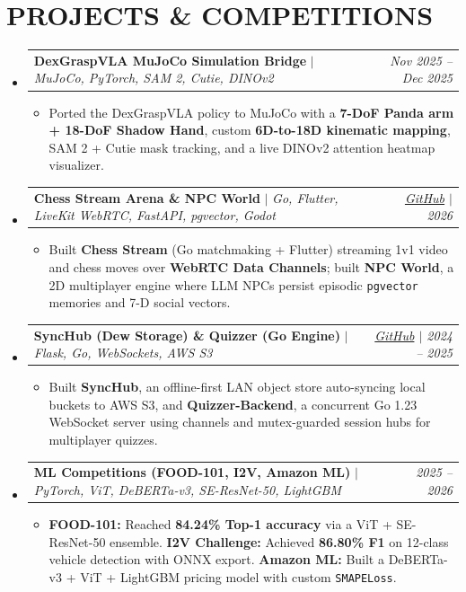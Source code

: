 \documentclass[10pt,a4paper]{article}
\makeatletter
\newcommand{\resumeItem}[1]{
  \item\small{{#1}}
}
\newcommand{\resumeProjectHeading}[2]{
    \vspace{-1pt}\item
    \begin{tabular*}{0.99\textwidth}{@{}l@{\extracolsep{\fill}}r@{}}
      \small #1 & \textit{\small #2} \\
    \end{tabular*}\vspace{-5pt}
}
\newcommand{\resumeItemListStart}{\begin{itemize}[leftmargin=0.18in, topsep=2pt, itemsep=1.5pt, parsep=0pt]}
\newcommand{\resumeItemListEnd}{\end{itemize}\vspace{-4pt}}
\makeatother
\begin{document}
\section{PROJECTS \& COMPETITIONS}
  \begin{itemize}[leftmargin=0.05in, label={}]

    \resumeProjectHeading
      {\textbf{DexGraspVLA MuJoCo Simulation Bridge} $|$ \emph{MuJoCo, PyTorch, SAM 2, Cutie, DINOv2}}{Nov 2025 -- Dec 2025}
      \resumeItemListStart
        \resumeItem{Ported the DexGraspVLA policy to MuJoCo with a \textbf{7-DoF Panda arm + 18-DoF Shadow Hand}, custom \textbf{6D-to-18D kinematic mapping}, SAM 2 + Cutie mask tracking, and a live DINOv2 attention heatmap visualizer.}
      \resumeItemListEnd

    \resumeProjectHeading
      {\textbf{Chess Stream Arena \& NPC World} $|$ \emph{Go, Flutter, LiveKit WebRTC, FastAPI, pgvector, Godot}}{\href{https://github.com/Anurag9689/chess_stream}{GitHub} $|$ 2026}
      \resumeItemListStart
        \resumeItem{Built \textbf{Chess Stream} (Go matchmaking + Flutter) streaming 1v1 video and chess moves over \textbf{WebRTC Data Channels}; built \textbf{NPC World}, a 2D multiplayer engine where LLM NPCs persist episodic \texttt{pgvector} memories and 7-D social vectors.}
      \resumeItemListEnd

    \resumeProjectHeading
      {\textbf{SyncHub (Dew Storage) \& Quizzer (Go Engine)} $|$ \emph{Flask, Go, WebSockets, AWS S3}}{\href{https://github.com/Anurag9689/SyncHub}{GitHub} $|$ 2024 -- 2025}
      \resumeItemListStart
        \resumeItem{Built \textbf{SyncHub}, an offline-first LAN object store auto-syncing local buckets to AWS S3, and \textbf{Quizzer-Backend}, a concurrent Go 1.23 WebSocket server using channels and mutex-guarded session hubs for multiplayer quizzes.}
      \resumeItemListEnd

    \resumeProjectHeading
      {\textbf{ML Competitions (FOOD-101, I2V, Amazon ML)} $|$ \emph{PyTorch, ViT, DeBERTa-v3, SE-ResNet-50, LightGBM}}{2025 -- 2026}
      \resumeItemListStart
        \resumeItem{\textbf{FOOD-101:} Reached \textbf{84.24\% Top-1 accuracy} via a ViT + SE-ResNet-50 ensemble. \textbf{I2V Challenge:} Achieved \textbf{86.80\% F1} on 12-class vehicle detection with ONNX export. \textbf{Amazon ML:} Built a DeBERTa-v3 + ViT + LightGBM pricing model with custom \texttt{SMAPELoss}.}
      \resumeItemListEnd

  \end{itemize}
\vspace{-6pt}
\end{document}
